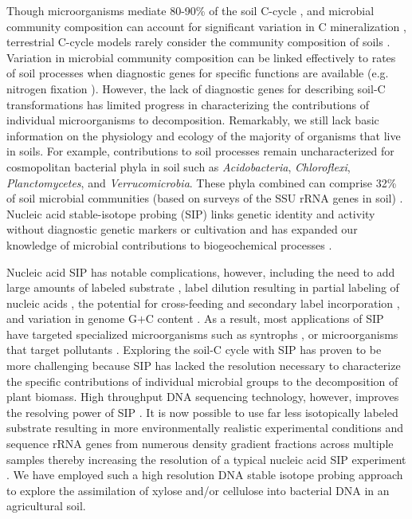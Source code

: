 Though microorganisms mediate 80-90\% of the soil C-cycle
\citep{ColemanCrossley_1996,Nannipieri_2003}, and microbial community
composition can account for significant variation in C mineralization
\citep{Strickland_2009}, terrestrial C-cycle models rarely consider the
community composition of soils \citep{Zak2006,Reed2007}. Variation in microbial
community composition can be linked effectively to rates of soil processes when
diagnostic genes for specific functions are available (e.g. nitrogen fixation
\citep{Hsu2009}).  However, the lack of diagnostic genes for describing soil-C
transformations has limited progress in characterizing the contributions of
individual microorganisms to decomposition. Remarkably, we still lack basic
information on the physiology and ecology of the majority of organisms that
live in soils. For example, contributions to soil processes remain
uncharacterized for cosmopolitan bacterial phyla in soil such as
\textit{Acidobacteria}, \textit{Chloroflexi}, \textit{Planctomycetes}, and
\textit{Verrucomicrobia}. These phyla combined can comprise 32\% of soil
microbial communities (based on surveys of the SSU rRNA genes in soil)
\citep{Janssen2006,Buckley2002}. Nucleic acid stable-isotope probing (SIP)
links genetic identity and activity without diagnostic genetic
markers or cultivation and has expanded our knowledge of microbial contributions to
biogeochemical processes \citep{Chen_Murrell_2010}. 

Nucleic acid SIP has notable complications, however, including the need to add
large amounts of labeled substrate \citep{radajewski2000stable}, label dilution
resulting in partial labeling of nucleic acids
\citep{radajewski2000stable,Manefield_2002,McDonald_2005}, the potential for
cross-feeding and secondary label incorporation
\citep{Morris_2002,Hutchens2004,14686943,DeRito2005,McDonald_2005,Ziegler_2005},
and variation in genome G$+$C content
\citep{Buckley_2007,9780408708036,Holben1995,Nusslein1999}. As a result, most
applications of SIP have targeted specialized microorganisms such as
syntrophs \citep{lueders2004}, or microorganisms that target pollutants
\citep{derito2005}. Exploring the soil-C cycle with SIP has proven to be more
challenging because SIP has lacked the resolution necessary to characterize the
specific contributions of individual microbial groups to the decomposition of
plant biomass. High throughput DNA sequencing technology, however, improves the
resolving power of SIP \citep{Aoyagi2015}. It is now possible to use far less
isotopically labeled substrate resulting in more environmentally realistic
experimental conditions and sequence rRNA genes from numerous density gradient
fractions across multiple samples thereby increasing the resolution of a
typical nucleic acid SIP experiment \citep{Verastegui_2014}\citep{Aoyagi2015}.
We have employed such a high resolution DNA stable isotope probing approach to
explore the assimilation of xylose and/or cellulose into bacterial DNA in an
agricultural soil. 

